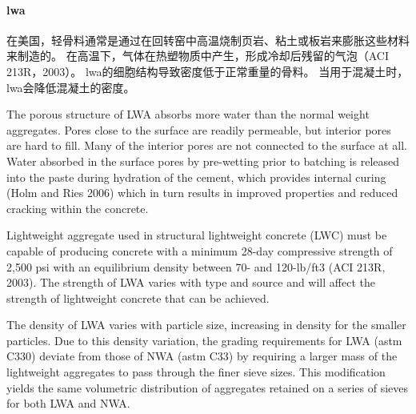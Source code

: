 \paragraph{\acrfull*{lwa}}
在美国，轻骨料通常是通过在回转窑中高温烧制页岩、粘土或板岩来膨胀这些材料来制造的。 在高温下，气体在热塑物质中产生，形成冷却后残留的气泡（ACI 213R，2003）。 \acrlong*{lwa}的细胞结构导致密度低于正常重量的骨料。 当用于混凝土时，\acrlong*{lwa}会降低混凝土的密度。

The porous structure of LWA absorbs more water than the normal weight aggregates. Pores close to the surface are readily permeable, but interior pores are hard to fill. Many of the interior pores are not connected to the surface at all. Water absorbed in the surface pores by pre-wetting prior to batching is released into the paste during hydration of the cement, which provides internal curing (Holm and Ries 2006) which in turn results in improved properties and reduced cracking within the concrete.

Lightweight aggregate used in structural lightweight concrete (LWC) must be capable of producing concrete with a minimum 28-day compressive strength of 2,500 psi with an equilibrium density between 70- and 120-lb/ft3 (ACI 213R, 2003). The strength of LWA varies with type and source and will affect the strength of lightweight concrete that can be achieved.

The density of LWA varies with particle size, increasing in density for the smaller particles. Due to this density variation, the grading requirements for LWA (\acrshort*{astm} C330) deviate from those of NWA (\acrshort*{astm} C33) by requiring a larger mass of the lightweight aggregates to pass through the finer sieve sizes. This modification yields the same volumetric distribution of aggregates retained on a series of sieves for both LWA and NWA.


